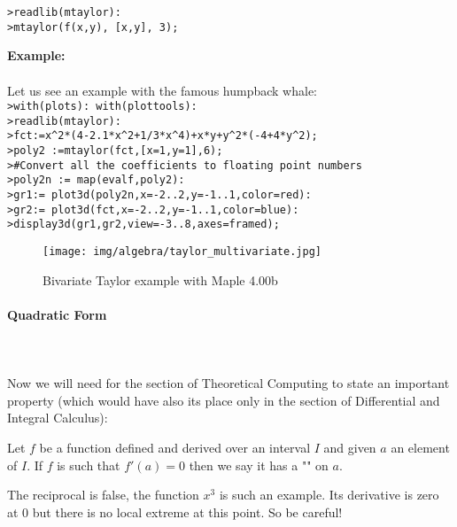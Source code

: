 	\texttt{>readlib(mtaylor):\\
	>mtaylor(f(x,y), [x,y], 3);}
	
	\begin{tcolorbox}[colframe=black,colback=white,sharp corners]
	\textbf{{\Large {}}Example:}\\\\
	Let us see an example with the famous humpback whale:\\
	
	\texttt{>with(plots): with(plottools):\\
	>readlib(mtaylor):\\
	>fct:=x\string^2*(4-2.1*x\string^2+1/3*x\string^4)+x*y+y\string^2*(-4+4*y\string^2);\\
	>poly2 :=mtaylor(fct,[x=1,y=1],6);\\
	>\#Convert all the coefficients to floating point numbers\\
	>poly2n := map(evalf,poly2):\\
	>gr1:= plot3d(poly2n,x=-2..2,y=-1..1,color=red):\\
	>gr2:= plot3d(fct,x=-2..2,y=-1..1,color=blue):\\
	>display3d({gr1,gr2},view=-3..8,axes=framed);
	}
	\begin{figure}[H]
		\centering
		\texttt{[image: img/algebra/taylor\_multivariate.jpg]}
		\caption{Bivariate Taylor example with Maple 4.00b}
	\end{figure}
	\end{tcolorbox}
	
	\paragraph{Quadratic Form}\mbox{}\\\\
	Now we will need for the section of Theoretical Computing to state an important property (which would have also its place only in the section of Differential and Integral Calculus):
	
	Let $f$ be a function defined and derived over an interval $I$ and given $a$ an element of $I$. If $f$ is such that $f'(a)=0$ then we say it has a "\label{local extremum}" on $a$.
	
	\begin{tcolorbox}[title=Remark,colframe=black,arc=10pt]
	The reciprocal is false, the function $x^3$ is such an example. Its derivative is zero at $0$ but there is no local extreme at this point. So be careful!
	\end{tcolorbox}
	
